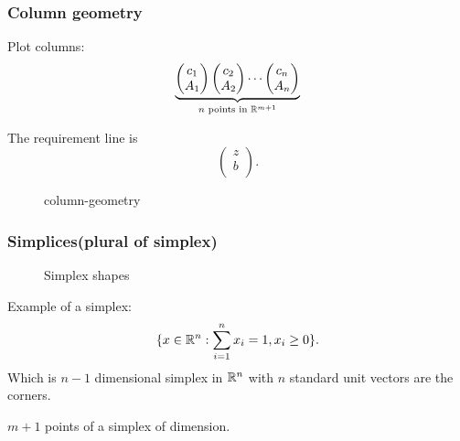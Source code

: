 \subsubsection{Column geometry}
Plot columns:
\[
	\underbrace{
		\begin{pmatrix}
			c_1 \\
			A_1 \\
		\end{pmatrix}
		\begin{pmatrix}
			c_2 \\
			A_2 \\
		\end{pmatrix}
		\cdots
		\begin{pmatrix}
			c_n \\
			A_n \\
		\end{pmatrix}}_{n \text{ points in }\mathbb{\MakeUppercase{R}}^{m+1}}
\]

The requirement line is
\[
	\begin{pmatrix}
		z \\
		b \\
	\end{pmatrix}.
\]

\begin{figure}[H]
	\centering
	\caption{column-geometry}
	\label{fig:column-geometry}
\end{figure}

\subsubsection{Simplices(plural of simplex)}
\begin{figure}[H]
	\centering
	\caption{Simplex shapes}
	\label{fig:simplex}
\end{figure}

\begin{eg}
	Example of a simplex:
	\[
		\{x\in \mathbb{\MakeUppercase{R}}^n : \sum\limits_{i=1}^{n} x_i = 1, x_i \geq 0\}.
	\]
	Which is \(n-1\) dimensional simplex in \(\mathbb{\MakeUppercase{R}}^n\) with \(n\)
	standard unit vectors are the corners.
\end{eg}

\begin{note}
	\(m+1\) points of a simplex of dimension.
\end{note}


